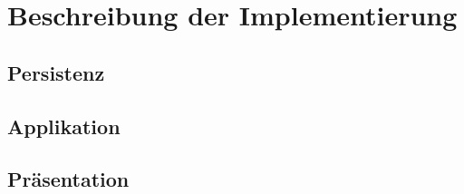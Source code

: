 \section{Beschreibung der Implementierung}

\subsection{Persistenz}

\subsection{Applikation}

\subsection{Präsentation}